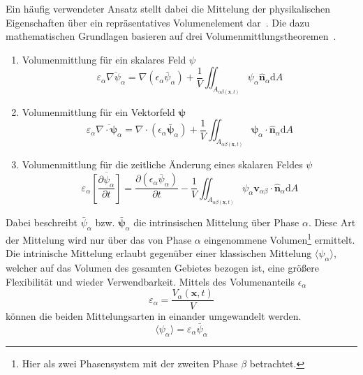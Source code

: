 Ein häufig verwendeter Ansatz stellt dabei die Mittelung der physikalischen Eigenschaften über ein repräsentatives Volumenelement dar~\cite{Burow2016,Arunachalam2019,Li2020}. Die dazu mathematischen Grundlagen basieren auf drei Volumenmittlungstheoremen~\cite{Gray1977}.
\begin{enumerate}
    \item Volumenmittlung für ein skalares Feld $\psi$ 
    \begin{equation}
        \varepsilon_{\alpha} \overline{\nabla \psi_{\alpha}} = \nabla \left(\epsilon_{\alpha} \bar{\psi}_{\alpha} \right) + \frac{1}{V} \iint_{A_{\alpha \beta(\boldsymbol{x},t)}}\psi_{\alpha} \hat{\boldsymbol{n}}_{\alpha} \text{d}A
    \end{equation}
    \item Volumenmittlung für ein Vektorfeld $\boldsymbol{\psi}$
    \begin{equation}
        \varepsilon_{\alpha} \overline{\nabla \cdot \boldsymbol{\psi}_{\alpha}} = \nabla \cdot \left(\epsilon_{\alpha} \bar{\boldsymbol{\psi}}_{\alpha} \right) + \frac{1}{V} \iint_{A_{\alpha \beta(\boldsymbol{x},t)}}\boldsymbol{\psi}_{\alpha} \cdot \hat{\boldsymbol{n}}_{\alpha} \text{d}A
    \end{equation}
    \item Volumenmittlung für die zeitliche Änderung eines skalaren Feldes $\psi$ 
    \begin{equation}
        \varepsilon_{\alpha} \overline{\left[\frac{\partial \psi_{\alpha}}{\partial t}\right]} = \frac{\partial \left(\epsilon_{\alpha} \bar{\psi}_{\alpha} \right)}{\partial t} - \frac{1}{V} \iint_{A_{\alpha \beta(\boldsymbol{x},t)}}\psi_{\alpha} \boldsymbol{v}_{\alpha \beta} \cdot \hat{\boldsymbol{n}}_{\alpha} \text{d}A
    \end{equation}
\end{enumerate}
Dabei beschreibt $\bar{\psi}_{\alpha}$ bzw. $\bar{\boldsymbol{\psi}}_{\alpha}$ die intrinsischen Mittelung über Phase $\alpha$. Diese Art der Mittelung wird nur über das von Phase $\alpha$ eingenommene Volumen\footnote{Hier als zwei Phasensystem mit der zweiten Phase $\beta$ betrachtet.} ermittelt. Die intrinische Mittelung erlaubt gegenüber einer klassischen Mittelung $\langle \psi_{\alpha} \rangle$, welcher auf das Volumen des gesamten Gebietes bezogen ist, eine größere Flexibilität und wieder Verwendbarkeit. Mittels des Volumenanteils $\epsilon_{\alpha}$
\begin{equation}
    \varepsilon_{\alpha} = \frac{V_{\alpha}(\boldsymbol{x},t)}{V} 
\end{equation}
können die beiden Mittelungsarten in einander umgewandelt werden.
\begin{equation}
    \langle \psi_{\alpha} \rangle = \varepsilon_{\alpha} \bar{\psi}_{\alpha}
\end{equation}

